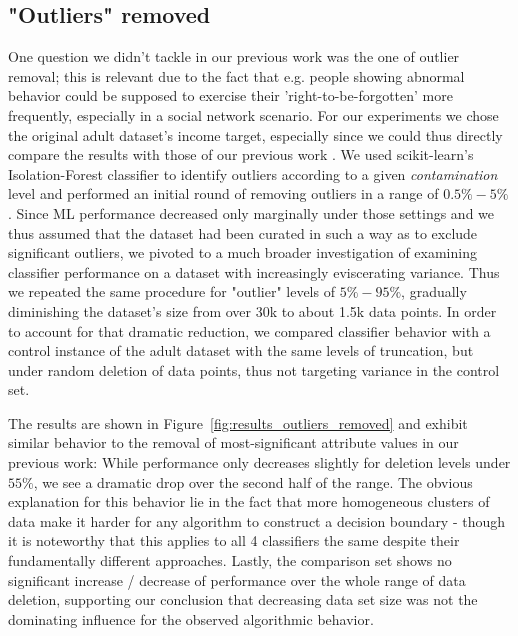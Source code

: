 \documentclass{llncs}
\begin{document}
\subsection{"Outliers" removed}
\label{ssect:outliers_removed}

One question we didn't tackle in our previous work was the one of outlier removal; this is relevant due to the fact that e.g. people showing abnormal behavior could be supposed to exercise their 'right-to-be-forgotten' more frequently, especially in a social network scenario. For our experiments we chose the original adult dataset's income target, especially since we could thus directly compare the results with those of our previous work \cite{malle2016right}. We used scikit-learn's Isolation-Forest classifier to identify outliers according to a given \textit{contamination} level and performed an initial round of removing outliers in a range of $0.5\% - 5\%$. Since ML performance decreased only marginally under those settings and we thus assumed that the dataset had been curated in such a way as to exclude significant outliers, we pivoted to a much broader investigation of examining classifier performance on a dataset with increasingly eviscerating variance. Thus we repeated the same procedure for "outlier" levels of $5\% - 95\%$, gradually diminishing the dataset's size from over 30k to about 1.5k data points. In order to account for that dramatic reduction, we compared classifier behavior with a control instance of the adult dataset with the same levels of truncation, but under random deletion of data points, thus not targeting variance in the control set. 

The results are shown in Figure~\ref{fig:results_outliers_removed} and exhibit similar behavior to the removal of most-significant attribute values in our previous work: While performance only decreases slightly for deletion levels under $55\%$, we see a dramatic drop over the second half of the range. The obvious explanation for this behavior lie in the fact that more homogeneous clusters of data make it harder for any algorithm to construct a decision boundary - though it is noteworthy that this applies to all 4 classifiers the same despite their fundamentally different approaches. Lastly, the comparison set shows no significant increase / decrease of performance over the whole range of data deletion, supporting our conclusion that decreasing data set size was not the dominating influence for the observed algorithmic behavior.
\end{document}
